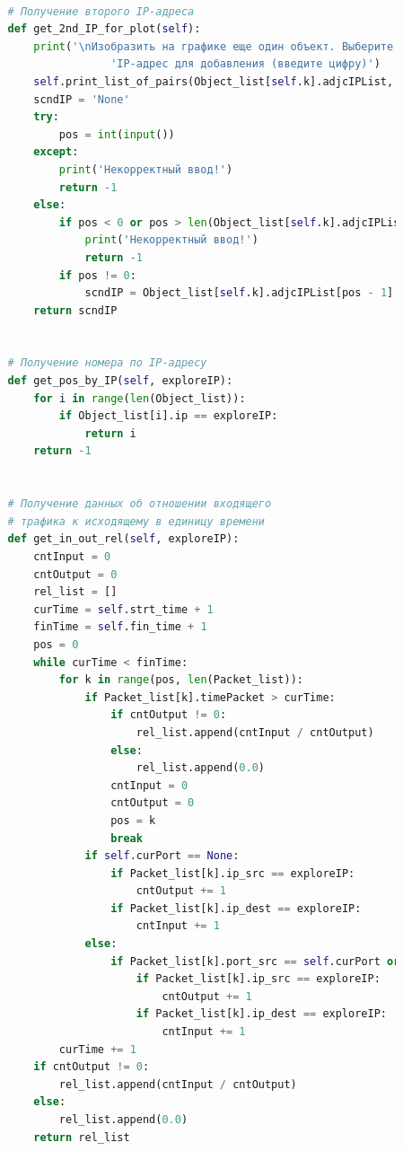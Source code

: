 \documentclass[bachelor, och, coursework]{SCWorks}
\begin{document}
\begin{lstlisting}[language=Python]
      
          # Получение второго IP-адреса
          def get_2nd_IP_for_plot(self):
              print('\nИзобразить на графике еще один объект. Выберите ' + \
                          'IP-адрес для добавления (введите цифру)')
              self.print_list_of_pairs(Object_list[self.k].adjcIPList, True)
              scndIP = 'None'
              try:
                  pos = int(input())
              except:
                  print('Некорректный ввод!')
                  return -1
              else:
                  if pos < 0 or pos > len(Object_list[self.k].adjcIPList):
                      print('Некорректный ввод!')
                      return -1
                  if pos != 0:
                      scndIP = Object_list[self.k].adjcIPList[pos - 1]
              return scndIP
      
      
          # Получение номера по IP-адресу
          def get_pos_by_IP(self, exploreIP):
              for i in range(len(Object_list)):
                  if Object_list[i].ip == exploreIP:
                      return i
              return -1
      
      
          # Получение данных об отношении входящего
          # трафика к исходящему в единицу времени
          def get_in_out_rel(self, exploreIP):
              cntInput = 0
              cntOutput = 0
              rel_list = []
              curTime = self.strt_time + 1
              finTime = self.fin_time + 1
              pos = 0
              while curTime < finTime:
                  for k in range(pos, len(Packet_list)):
                      if Packet_list[k].timePacket > curTime:
                          if cntOutput != 0:
                              rel_list.append(cntInput / cntOutput)
                          else:
                              rel_list.append(0.0)
                          cntInput = 0
                          cntOutput = 0
                          pos = k
                          break
                      if self.curPort == None:
                          if Packet_list[k].ip_src == exploreIP:
                              cntOutput += 1
                          if Packet_list[k].ip_dest == exploreIP:
                              cntInput += 1
                      else:
                          if Packet_list[k].port_src == self.curPort or Packet_list[k].port_dest == self.curPort:
                              if Packet_list[k].ip_src == exploreIP:
                                  cntOutput += 1
                              if Packet_list[k].ip_dest == exploreIP:
                                  cntInput += 1
                  curTime += 1
              if cntOutput != 0:
                  rel_list.append(cntInput / cntOutput)
              else:
                  rel_list.append(0.0)
              return rel_list
      

\end{lstlisting}
\end{document}
